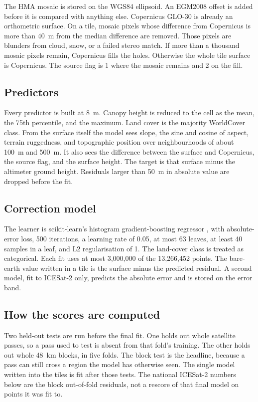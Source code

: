 \documentclass[11pt]{article}
\begin{document}
The HMA mosaic is stored on the WGS84 ellipsoid.
An EGM2008 offset is added before it is compared with anything else.
Copernicus GLO-30 is already an orthometric surface.
On a tile, mosaic pixels whose difference from Copernicus is more than 40~m from the median difference are removed.
Those pixels are blunders from cloud, snow, or a failed stereo match.
If more than a thousand mosaic pixels remain, Copernicus fills the holes.
Otherwise the whole tile surface is Copernicus.
The source flag is 1 where the mosaic remains and 2 on the fill.

\subsection{Predictors}

Every predictor is built at 8~m.
Canopy height is reduced to the cell as the mean, the 75th percentile, and the maximum.
Land cover is the majority WorldCover class.
From the surface itself the model sees slope, the sine and cosine of aspect, terrain ruggedness, and topographic position over neighbourhoods of about 100~m and 500~m.
It also sees the difference between the surface and Copernicus, the source flag, and the surface height.
The target is that surface minus the altimeter ground height.
Residuals larger than 50~m in absolute value are dropped before the fit.

\subsection{Correction model}

The learner is scikit-learn's histogram gradient-boosting regressor \citep{pedregosa2011sklearn}, with absolute-error loss, 500 iterations, a learning rate of 0.05, at most 63 leaves, at least 40 samples in a leaf, and L2 regularisation of 1.
The land-cover class is treated as categorical.
Each fit uses at most 3,000,000 of the 13,266,452 points.
The bare-earth value written in a tile is the surface minus the predicted residual.
A second model, fit to ICESat-2 only, predicts the absolute error and is stored on the error band.

\subsection{How the scores are computed}

Two held-out tests are run before the final fit.
One holds out whole satellite passes, so a pass used to test is absent from that fold's training.
The other holds out whole 48~km blocks, in five folds.
The block test is the headline, because a pass can still cross a region the model has otherwise seen.
The single model written into the tiles is fit after those tests.
The national ICESat-2 numbers below are the block out-of-fold residuals, not a rescore of that final model on points it was fit to.
\end{document}
